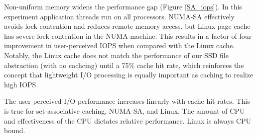 Non-uniform memory widens the performance gap (Figure \ref{SA_iops}).
In this experiment application threads run on all processors.
NUMA-SA effectively avoids lock contention and reduces remote memory access,
but Linux page cache has severe lock contention in the NUMA machine.
This results in a factor of four improvement in user-perceived
IOPS when compared with the Linux cache.  Notably, the Linux cache does not match the 
performance of our SSD file abstraction (with no cachcing) until a 75\% 
cache hit rate, which reinforces the concept that lightweight I/O processing is 
equally important as caching to realize high IOPS.

The user-perceived I/O performance increases linearly with cache hit rates.
This is true for set-associative caching, NUMA-SA, and Linux.
The amount of CPU and effectiveness of the CPU dictates relative performance.
Linux is always CPU bound.

